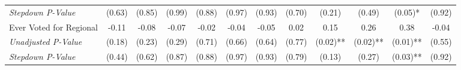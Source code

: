 \begin{tabular}{l c c c c c c c c c c c}
\quad \textit{Stepdown P-Value} & (0.63) & (0.85) & (0.99) & (0.88) & (0.97) & (0.93) & (0.70) & (0.21) & (0.49) & (0.05)* & (0.92) \\
Ever Voted for Regional & -0.11 & -0.08 & -0.07 & -0.02 & -0.04 & -0.05 & 0.02 & 0.15 & 0.26 & 0.38 & -0.04 \\
\quad \textit{Unadjusted P-Value} & (0.18) & (0.23) & (0.29) & (0.71) & (0.66) & (0.64) & (0.77) & (0.02)** & (0.02)** & (0.01)** & (0.55) \\
\quad \textit{Stepdown P-Value} & (0.44) & (0.62) & (0.87) & (0.88) & (0.97) & (0.93) & (0.79) & (0.13) & (0.27) & (0.03)** & (0.92) \\
\bottomrule
\end{tabular}

